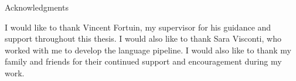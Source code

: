 \thispagestyle{empty}

\vspace*{20mm}

\begin{center}
    { Acknowledgments}
\end{center}

\vspace{10mm}

I would like to thank Vincent Fortuin, my supervisor for his guidance and support throughout this thesis. I would also like to thank Sara Visconti,
who worked with me to develop the language pipeline. I would also like to thank my family and friends for their continued support and encouragement during my work.



\cleardoublepage{}
